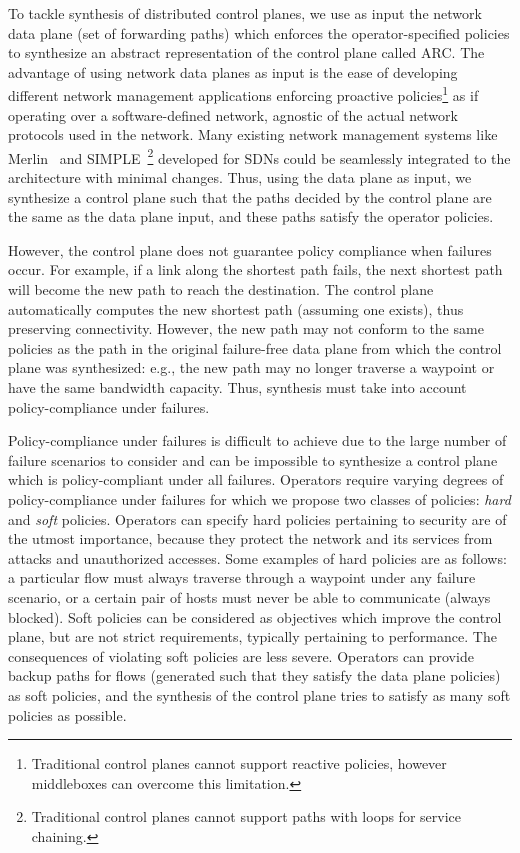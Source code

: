To tackle synthesis 
of distributed control planes, 
we use as input the network data plane 
(set of forwarding paths) which 
enforces the operator-specified policies to
synthesize an abstract representation of the control plane
called ARC. 
The advantage of using network data planes as 
input is the ease of developing
different network management applications 
enforcing proactive policies\footnote{
Traditional control planes cannot support reactive policies, however
middleboxes can overcome this limitation.} 
as if operating over a software-defined
network, agnostic of the actual network protocols used in the network. 
Many existing network management systems like Merlin~\cite{merlin} 
and SIMPLE~\cite{simple}\footnote{
Traditional control planes cannot support 
paths with loops for service chaining.} developed for SDNs 
could be seamlessly integrated to the architecture with minimal changes.
Thus, using the data plane as input, we synthesize a control plane
such that the paths decided by the control plane are the same 
as the data plane input, and these paths satisfy the operator 
policies.

However, the control plane does not guarantee policy compliance 
when failures occur. For
example, if a link along the shortest path 
fails, the next shortest path will become the new path to reach the
destination. The control plane automatically computes the new shortest path
(assuming one exists), thus preserving connectivity. 
However, the new path may
not conform to the same policies as the path in the 
original failure-free data
plane from which the control plane was synthesized: 
e.g., the new path may no longer
traverse a waypoint or have the same bandwidth capacity. Thus,
synthesis must take into account policy-compliance under failures.

Policy-compliance under failures is difficult to achieve due 
to the large number of failure scenarios to consider and can 
be impossible to synthesize a control plane which is 
policy-compliant under all failures. Operators require 
varying degrees of policy-compliance under failures for 
which we propose two classes of policies: {\em hard} and
{\em soft} policies. Operators can specify 
hard policies pertaining
to security are of the utmost importance, 
because they protect the network and
its services from attacks and unauthorized accesses. Some 
examples of hard policies are as follows: 
a particular flow must always traverse through a waypoint 
under any failure scenario, or a certain pair of hosts must 
never be able to communicate (always blocked). 
Soft policies can be considered as objectives which improve 
the control plane, but are not strict requirements, typically
pertaining to performance. The consequences of violating
soft policies are less severe. Operators can provide 
backup paths for flows (generated such that they 
satisfy the data plane policies) as soft policies, 
and the synthesis of the control plane 
tries to satisfy as many soft policies as 
possible. 


